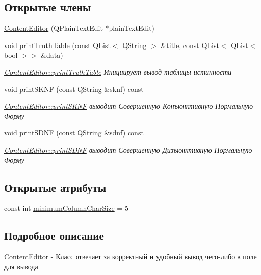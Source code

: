 \subsection*{Открытые члены}
\begin{DoxyCompactItemize}
\item 
\hyperlink{class_content_editor_a7254201f7630aa7c3048f5ff5f7b8bd1}{Content\+Editor} (Q\+Plain\+Text\+Edit $\ast$plain\+Text\+Edit)
\item 
void \hyperlink{class_content_editor_a4244e9ccd627ab8146d74637837872e9}{print\+Truth\+Table} (const Q\+List$<$ Q\+String $>$ \&title, const Q\+List$<$ Q\+List$<$ bool $>$$>$ \&data)
\begin{DoxyCompactList}\small\item\em \hyperlink{class_content_editor_a4244e9ccd627ab8146d74637837872e9}{Content\+Editor\+::print\+Truth\+Table} Инициирует вывод таблицы истинности \end{DoxyCompactList}\item 
void \hyperlink{class_content_editor_a5492b3c4a67484e9b01322fd6b82870a}{print\+S\+K\+NF} (const Q\+String \&sknf) const
\begin{DoxyCompactList}\small\item\em \hyperlink{class_content_editor_a5492b3c4a67484e9b01322fd6b82870a}{Content\+Editor\+::print\+S\+K\+NF} выводит Совершенную Конъюнктивную Нормальную Форму \end{DoxyCompactList}\item 
void \hyperlink{class_content_editor_a929362122ef024a5b4ddc180f8af3423}{print\+S\+D\+NF} (const Q\+String \&sdnf) const
\begin{DoxyCompactList}\small\item\em \hyperlink{class_content_editor_a929362122ef024a5b4ddc180f8af3423}{Content\+Editor\+::print\+S\+D\+NF} выводит Совершенную Дизъюнктивную Нормальную Форму \end{DoxyCompactList}\end{DoxyCompactItemize}
\subsection*{Открытые атрибуты}
\begin{DoxyCompactItemize}
\item 
const int \hyperlink{class_content_editor_a20a8d18e264777aee600ee638f08eb99}{minimum\+Column\+Char\+Size} = 5
\end{DoxyCompactItemize}


\subsection{Подробное описание}
\hyperlink{class_content_editor}{Content\+Editor} -\/ Класс отвечает за корректный и удобный вывод чего-\/либо в поле для вывода 

